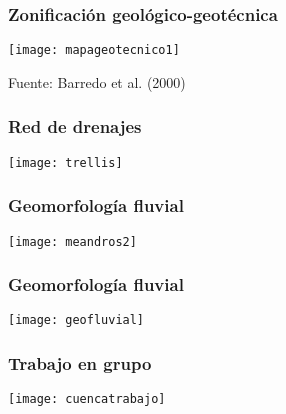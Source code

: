 \documentclass{beamer}
\begin{document}
\begin{frame}
\frametitle{Zonificación geológico-geotécnica}
\begin{center}
   	\texttt{[image: mapageotecnico1]}
\end{center}
\tiny{Fuente: Barredo et al. (2000)}
\end{frame}
\begin{frame}
\frametitle{Red de drenajes}
\begin{center}
   	\texttt{[image: trellis]}
\end{center}
\end{frame}
\begin{frame}
\frametitle{Geomorfología fluvial}
\begin{center}
   	\texttt{[image: meandros2]}
\end{center}
\end{frame}
\begin{frame}
\frametitle{Geomorfología fluvial}
\begin{center}
   	\texttt{[image: geofluvial]}
\end{center}
\end{frame}
\begin{frame}
\frametitle{Trabajo en grupo}
\begin{center}
   	\texttt{[image: cuencatrabajo]}
\end{center}
\end{frame}
\end{document}
